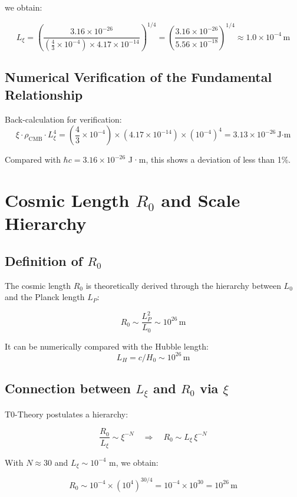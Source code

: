 \documentclass[12pt,a4paper]{article}
\numberwithin{equation}{section}
\begin{document}
	we obtain:
	
	\[
	L_\xi = \left(\frac{3.16 \times 10^{-26}}{(\frac{4}{3} \times 10^{-4}) \times 4.17 \times 10^{-14}}\right)^{1/4} = \left(\frac{3.16 \times 10^{-26}}{5.56 \times 10^{-18}}\right)^{1/4} \approx 1.0 \times 10^{-4}\,\text{m}
	\]
	
	\subsection{Numerical Verification of the Fundamental Relationship}
	
	Back-calculation for verification:
	\[
	\xi \cdot \rho_{\text{CMB}} \cdot L_\xi^4 = \left(\frac{4}{3} \times 10^{-4}\right) \times \left(4.17 \times 10^{-14}\right) \times (10^{-4})^4 = 3.13 \times 10^{-26}\,\text{J·m}
	\]
	
	Compared with $\hbar c = 3.16 \times 10^{-26}$ J·m, this shows a deviation of less than 1\%.
	
	\section{Cosmic Length $R_0$ and Scale Hierarchy}
	
	\subsection{Definition of $R_0$}
	
	The cosmic length $R_0$ is theoretically derived through the hierarchy between $L_0$ and the Planck length $L_P$:
	
	\[
	R_0 \sim \frac{L_P^2}{L_0} \sim 10^{26}\,\text{m}
	\]
	
	It can be numerically compared with the Hubble length:
	\[
	L_H = c / H_0 \sim 10^{26}\,\text{m}
	\]
	
	\subsection{Connection between $L_\xi$ and $R_0$ via $\xi$}
	
	T0-Theory postulates a hierarchy:
	
	\[
	\frac{R_0}{L_\xi} \sim \xi^{-N} \quad \Rightarrow \quad R_0 \sim L_\xi \, \xi^{-N}
	\]
	
	With $N \approx 30$ and $L_\xi \sim 10^{-4}$ m, we obtain:
	
	\[
	R_0 \sim 10^{-4} \times (10^4)^{30/4} = 10^{-4} \times 10^{30} = 10^{26}\,\text{m}
	\]
	
\end{document}
